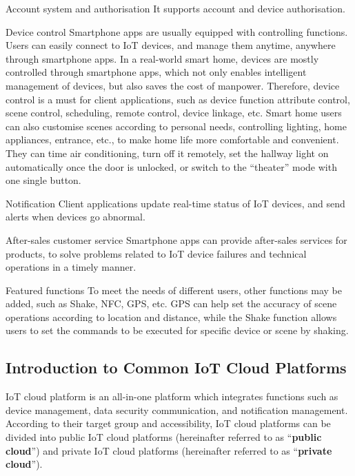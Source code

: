 \documentclass[a4paper,12pt]{book}
\begin{document}
\begin{term}{Account system and authorisation}
    It supports account and device authorisation.
\end{term}

\begin{term}{Device control}
    Smartphone apps are usually equipped with controlling functions. Users can easily connect to IoT devices, and manage them anytime, anywhere through smartphone apps. In a real-world smart home, devices are mostly controlled through smartphone apps, which not only enables intelligent management of devices, but also saves the cost of manpower. Therefore, device control is a must for client applications, such as device function attribute control, scene control, scheduling, remote control, device linkage, etc. Smart home users can also customise scenes according to personal needs, controlling lighting, home appliances, entrance, etc., to make home life more comfortable and convenient. They can time air conditioning, turn off it remotely, set the hallway light on automatically once the door is unlocked, or switch to the “theater” mode with one single button.
\end{term}

\begin{term}{Notification}
    Client applications update real-time status of IoT devices, and send alerts when devices go abnormal.
\end{term}

\begin{term}{After-sales customer service}
    Smartphone apps can provide after-sales services for products, to solve problems related to IoT device failures and technical operations in a timely manner.
\end{term}

\begin{term}{Featured functions}
    To meet the needs of different users, other functions may be added, such as Shake, NFC, GPS, etc. GPS can help set the accuracy of scene operations according to location and distance, while the Shake function allows users to set the commands to be executed for specific device or scene by shaking.
\end{term}

\subsection{Introduction to Common IoT Cloud Platforms}
IoT cloud platform is an all-in-one platform which integrates functions such as device management, data security communication, and notification management. According to their target group and accessibility, IoT cloud platforms can be divided into public IoT cloud platforms (hereinafter referred to as “\textbf{public cloud}”) and private IoT cloud platforms (hereinafter referred to as “\textbf{private cloud}”). 
\end{document}
